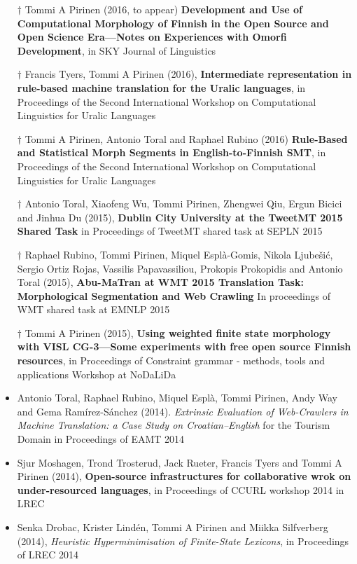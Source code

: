 \documentclass[a4paper]{article}
\begin{document}
\begin{itemize}
\item[$\dagger$] Tommi A Pirinen (2016, to appear) \textbf{Development and Use of Computational Morphology of Finnish in the Open Source and Open Science Era---Notes on Experiences with Omorfi Development}, in SKY Journal of Linguistics
\item[$\dagger$] Francis Tyers, Tommi A Pirinen (2016), \textbf{Intermediate representation in rule-based machine translation for the Uralic languages}, in  Proceedings of the Second International Workshop on Computational Linguistics for Uralic Languages
\item[$\dagger$] Tommi A Pirinen, Antonio Toral and Raphael Rubino (2016) \textbf{Rule-Based and Statistical Morph Segments in English-to-Finnish SMT}, in Proceedings of the Second International Workshop on Computational Linguistics for Uralic Languages
\item[$\dagger$] Antonio Toral, Xiaofeng Wu, Tommi Pirinen, Zhengwei Qiu, Ergun Bicici and Jinhua Du (2015), \textbf{Dublin City University at the TweetMT 2015 Shared Task} in Proceedings of TweetMT shared task at SEPLN 2015
\item[$\dagger$] Raphael Rubino, Tommi Pirinen, Miquel Esplà-Gomis, Nikola Ljubešić, Sergio Ortiz Rojas, Vassilis Papavassiliou, Prokopis Prokopidis and Antonio Toral (2015), \textbf{Abu-MaTran at WMT 2015 Translation Task: Morphological Segmentation and Web Crawling} In proceedings of WMT shared task at EMNLP 2015
\item[$\dagger$] Tommi A Pirinen (2015), \textbf{Using weighted finite state morphology with VISL CG-3—Some experiments with free open source Finnish resources}, in Proceedings of Constraint grammar - methods, tools and applications Workshop at NoDaLiDa
\item Antonio Toral, Raphael Rubino, Miquel Esplà, Tommi Pirinen, Andy Way and Gema Ramírez-Sánchez (2014). \textit{Extrinsic Evaluation of Web-Crawlers in Machine Translation: a Case Study on Croatian–English} for the Tourism Domain in Proceedings of EAMT 2014
\item Sjur Moshagen, Trond Trosterud, Jack Rueter, Francis Tyers and Tommi A Pirinen (2014), \textbf{Open-source infrastructures for collaborative wrok on under-resourced languages}, in Proceedings of CCURL workshop 2014 in LREC
\item Senka Drobac, Krister Lindén, Tommi A Pirinen and Miikka Silfverberg (2014), \textit{Heuristic Hyperminimisation of Finite-State Lexicons}, in Proceedings of LREC 2014

\end{itemize}
\end{document}
